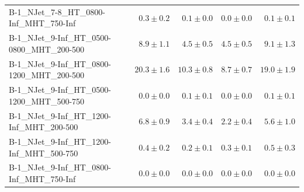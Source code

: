 \documentclass{beamer}
\begin{document}
\begin{frame}
\begin{tabular}{lrrrr}
       B-1\_NJet\_7-8\_HT\_0800-Inf\_MHT\_750-Inf &               $0.3\pm0.2$&              $0.1\pm0.0$&              $0.0\pm0.0$&                   $0.1\pm0.1$ \\
    B-1\_NJet\_9-Inf\_HT\_0500-0800\_MHT\_200-500 &               $8.9\pm1.1$&              $4.5\pm0.5$&              $4.5\pm0.5$&                   $9.1\pm1.3$ \\
    B-1\_NJet\_9-Inf\_HT\_0800-1200\_MHT\_200-500 &              $20.3\pm1.6$&             $10.3\pm0.8$&              $8.7\pm0.7$&                  $19.0\pm1.9$ \\
    B-1\_NJet\_9-Inf\_HT\_0500-1200\_MHT\_500-750 &               $0.0\pm0.0$&              $0.1\pm0.1$&              $0.0\pm0.0$&                   $0.1\pm0.1$ \\
     B-1\_NJet\_9-Inf\_HT\_1200-Inf\_MHT\_200-500 &               $6.8\pm0.9$&              $3.4\pm0.4$&              $2.2\pm0.4$&                   $5.6\pm1.0$ \\
     B-1\_NJet\_9-Inf\_HT\_1200-Inf\_MHT\_500-750 &               $0.4\pm0.2$&              $0.2\pm0.1$&              $0.3\pm0.1$&                   $0.5\pm0.3$ \\
     B-1\_NJet\_9-Inf\_HT\_0800-Inf\_MHT\_750-Inf &               $0.0\pm0.0$&              $0.0\pm0.0$&              $0.0\pm0.0$&                   $0.0\pm0.0$ \\
\bottomrule
\end{tabular}
\end{frame}
\end{document}
